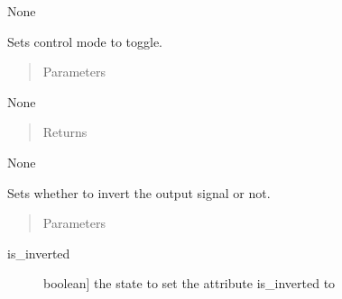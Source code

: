 \documentclass[letterpaper,10pt,english]{sphinxmanual}
\begin{document}
\begin{fulllineitems}
\begin{fulllineitems}
\sphinxAtStartPar
None

\end{fulllineitems}


\begin{fulllineitems}
\label{\detokenize{base:MultiInputOutputObject.MultiInputOutputObject.set_control_toggle}}
\sphinxAtStartPar
Sets control mode to toggle.
\begin{quote}\begin{description}
\item[{Parameters}] \leavevmode
\end{description}\end{quote}

\sphinxAtStartPar
None
\begin{quote}\begin{description}
\item[{Returns}] \leavevmode
\end{description}\end{quote}

\sphinxAtStartPar
None

\end{fulllineitems}


\begin{fulllineitems}
\label{\detokenize{base:MultiInputOutputObject.MultiInputOutputObject.set_inversion}}
\sphinxAtStartPar
Sets whether to invert the output signal or not.
\begin{quote}\begin{description}
\item[{Parameters}] \leavevmode
\end{description}\end{quote}
\begin{description}
\item[{is\_inverted}] \leavevmode{[}boolean{]}
\sphinxAtStartPar
the state to set the attribute is\_inverted to


\end{description}
\end{fulllineitems}
\end{fulllineitems}
\end{document}
